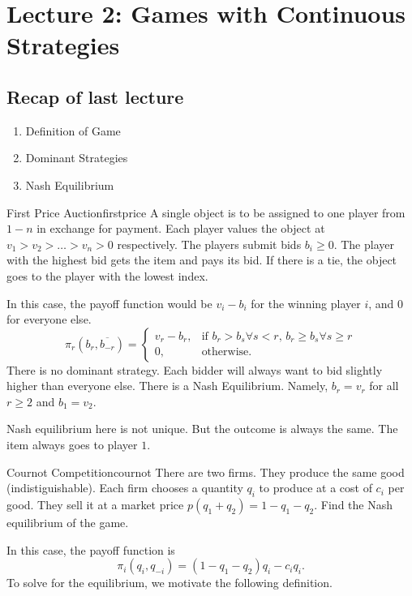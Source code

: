 \section{Lecture 2: Games with Continuous Strategies}
\newsection
\subsection*{Recap of last lecture}
\begin{enumerate}
    \item Definition of Game
    \item Dominant Strategies
    \item Nash Equilibrium
\end{enumerate}

\begin{aexample}{First Price Auction}{firstprice}
    A single object is to be assigned to one player from $1-n$ in exchange for payment.
    Each player values the object at $v_1>v_2>\ldots>v_n>0$ respectively.
    The players submit bids $b_i\geq 0$. The player with the highest bid gets the item and pays its bid. If there is a tie, the object goes to the player with the lowest index.
\end{aexample}

In this case, the payoff function would be $v_i-b_i$ for the winning player $i$, and $0$ for everyone else.
\[
\pi_r(b_r,\overline{b_{-r}})=\begin{cases}
    v_r-b_r, & \textrm{if $b_r>b_s\forall s<r$, $b_r\geq b_s \forall s\geq r$}\\
    0, & \textrm{otherwise.}
\end{cases}
\]
There is no dominant strategy. Each bidder will always want to bid slightly higher than everyone else. There is a Nash Equilibrium. Namely, $b_r=v_r$ for all $r\geq 2$ and $b_1=v_2$. 
\begin{remark}
    Nash equilibrium here is not unique. But the outcome is always the same. The item always goes to player $1$.
\end{remark}
\begin{aexample}{Cournot Competition}{cournot}
    There are two firms. They produce the same good (indistiguishable). Each firm chooses a quantity $q_{i}$ to produce at a cost of $c_i$ per good. They sell it at a market price $p(q_1+q_2)=1-q_1-q_2.$ Find the Nash equilibrium of the game.
\end{aexample}
In this case, the payoff function is \[
\pi_i(q_i,q_{-i})=(1-q_1-q_2)q_i-c_i q_i.
\]
To solve for the equilibrium, we motivate the following definition.

